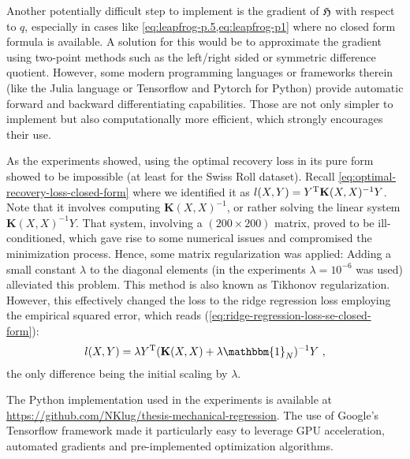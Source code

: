 Another potentially difficult step to implement is the gradient of $\mathfrak{H}$ with respect to $q$, especially in cases like \cref{eq:leapfrog-p.5,eq:leapfrog-p1} where no closed form formula is available.
A solution for this would be to approximate the gradient using two-point methods such as the left/right sided or symmetric difference quotient.
However, some modern programming languages or frameworks therein (like the Julia language or Tensorflow and Pytorch for Python) provide automatic forward and backward differentiating capabilities.
Those are not only simpler to implement but also computationally more efficient, which strongly encourages their use.

As the experiments showed, using the optimal recovery loss in its pure form showed to be impossible (at least for the Swiss Roll dataset).
Recall \cref{eq:optimal-recovery-loss-closed-form} where we identified it as $l(X, Y) = Y^{\mathrm{T}} \mathbf{K}(X, X)^{-1} Y$.
Note that it involves computing $\mathbf{K}(X, X)^{-1}$, or rather solving the linear system $\mathbf{K}(X, X)^{-1} Y$.
That system, involving a $(200\times200)$ matrix, proved to be ill-conditioned, which gave rise to some numerical issues and compromised the minimization process.
Hence, some matrix regularization was applied:
Adding a small constant $\lambda$ to the diagonal elements (in the experiments $\lambda = 10^{-6}$ was used) alleviated this problem.
This method is also known as Tikhonov regularization.
However, this effectively changed the loss to the ridge regression loss employing the empirical squared error, which reads (\cref{eq:ridge-regression-loss-se-closed-form}):
\begin{equation}
	l(X, Y) = \lambda Y^\T (\mathbf{K}(X, X) + \lambda \mathbbm{1}_N)^{-1} Y \ ,
\end{equation}
the only difference being the initial scaling by $\lambda$.

The Python implementation used in the experiments is available at \url{https://github.com/NKlug/thesis-mechanical-regression}.
The use of Google's Tensorflow framework \cite{tensorflow15} made it particularly easy to leverage GPU acceleration, automated gradients and pre-implemented optimization algorithms.
